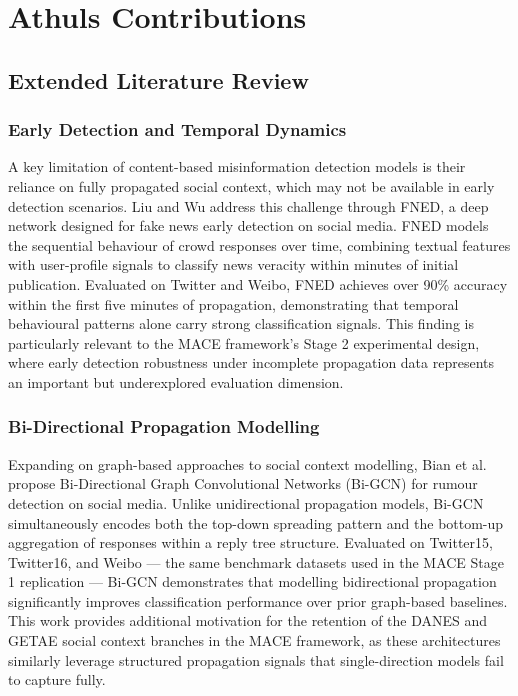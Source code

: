 \chapter{Athuls Contributions}

\section{Extended Literature Review}

\subsection{Early Detection and Temporal Dynamics}

A key limitation of content-based misinformation detection models is their reliance on fully propagated social context, which may not be available in early detection scenarios. Liu and Wu \cite{Liu2020} address this challenge through FNED, a deep network designed for fake news early detection on social media. FNED models the sequential behaviour of crowd responses over time, combining textual features with user-profile signals to classify news veracity within minutes of initial publication. Evaluated on Twitter and Weibo, FNED achieves over 90\% accuracy within the first five minutes of propagation, demonstrating that temporal behavioural patterns alone carry strong classification signals. This finding is particularly relevant to the MACE framework's Stage 2 experimental design, where early detection robustness under incomplete propagation data represents an important but underexplored evaluation dimension.

\subsection{Bi-Directional Propagation Modelling}

Expanding on graph-based approaches to social context modelling, Bian et al.\ \cite{Bian2020} propose Bi-Directional Graph Convolutional Networks (Bi-GCN) for rumour detection on social media. Unlike unidirectional propagation models, Bi-GCN simultaneously encodes both the top-down spreading pattern and the bottom-up aggregation of responses within a reply tree structure. Evaluated on Twitter15, Twitter16, and Weibo — the same benchmark datasets used in the MACE Stage 1 replication — Bi-GCN demonstrates that modelling bidirectional propagation significantly improves classification performance over prior graph-based baselines. This work provides additional motivation for the retention of the DANES and GETAE social context branches in the MACE framework, as these architectures similarly leverage structured propagation signals that single-direction models fail to capture fully.

